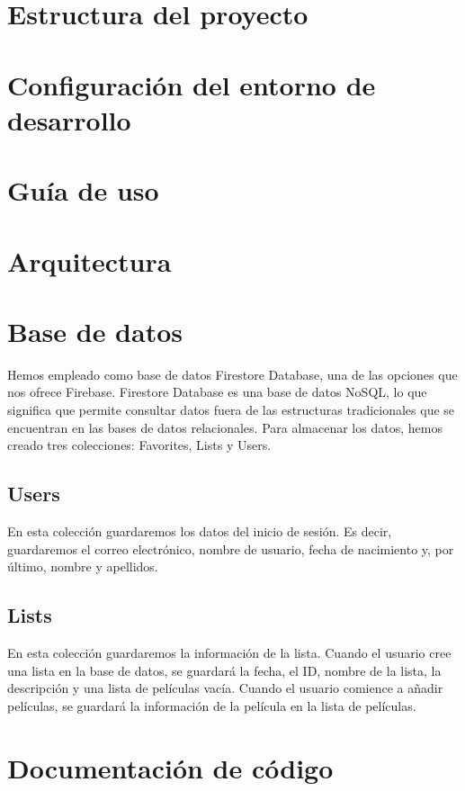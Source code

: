 \documentclass{article}
\begin{document}
\section{Estructura del proyecto}

\section{Configuración del entorno de desarrollo}

\section{Guía de uso}

\section{Arquitectura}


\section{Base de datos}

    Hemos empleado como base de datos Firestore Database, una de las opciones que nos ofrece Firebase. Firestore Database es una base de datos NoSQL, lo que significa que permite consultar datos fuera de las estructuras tradicionales que se encuentran en las bases de datos relacionales. Para almacenar los datos, hemos creado tres colecciones: Favorites, Lists y Users.
    
    \subsection{Users}
    En esta colección guardaremos los datos del inicio de sesión. Es decir, guardaremos el correo electrónico, nombre de usuario, fecha de nacimiento y, por último, nombre y apellidos.
    
    \subsection{Lists}
    En esta colección guardaremos la información de la lista. Cuando el usuario cree una lista en la base de datos, se guardará la fecha, el ID, nombre de la lista, la descripción y una lista de películas vacía. Cuando el usuario comience a añadir películas, se guardará la información de la película en la lista de películas.

\section{Documentación de código}
\end{document}
